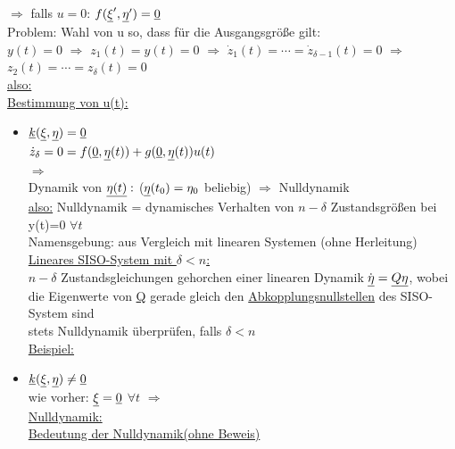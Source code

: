 \documentclass[openany,a4paper,11pt]{book}
\begin{document}
$\Rightarrow$ falls $u=0$: $f(\uline{\xi}',\uline{\eta}')=\uline{0}$\\
Problem: Wahl von u so, dass für die Ausgangsgröße gilt: \\
$y(t)=0$ $\Rightarrow$ $z_1(t)=y(t)=0$ $\Rightarrow$ $\dot{z}_1(t)=\cdots=\dot{z}_{\delta-1}(t)=0$ $\Rightarrow$ $z_2(t)=\cdots=z_{\delta}(t)=0$\\
\uline{also:} \\
\uline{Bestimmung von u(t):}\begin{itemize}
    \item $\uline{k}(\uline{\xi},\uline{\eta})=\uline{0}$\\
    $\dot{z}_{\delta}=0=f(\uline{0},\uline{\eta}(t))+g(\uline{0},\uline{\eta}(t))u(t)$\\
    $\Rightarrow$ \\
    Dynamik von $\uline{\eta(t)}:$   ($\uline{\eta}(t_0)=\eta_0$ beliebig) $\Rightarrow$ Nulldynamik\\
    \uline{also:} Nulldynamik = dynamisches Verhalten von $n-\delta$ Zustandsgrößen bei y(t)=0 $\forall t$\\
    Namensgebung: aus Vergleich mit linearen Systemen (ohne Herleitung)\\
    \uline{Lineares SISO-System mit $\delta<n$:} \\
    $n-\delta$ Zustandsgleichungen gehorchen einer linearen Dynamik $\dot{\uline{\eta}}=\uline{Q}\uline{\eta}$, wobei die Eigenwerte von \uline{Q} gerade gleich den \uline{Abkopplungsnullstellen} des SISO-System sind\\
    stets Nulldynamik überprüfen, falls $\delta<n$\\
    \uline{Beispiel:} 
    \item $\uline{k}(\uline{\xi},\uline{\eta})\ne\uline{0}$\\
    wie vorher: $\uline{\xi}=\uline{0}$ $\forall t$ $\Rightarrow$ \\
    \uline{Nulldynamik:} \\
    \uline{Bedeutung der Nulldynamik(ohne Beweis)}\\

\end{itemize}
\end{document}
